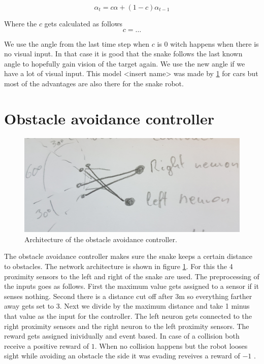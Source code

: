 \begin{equation}
\alpha_t = c \alpha + \left(1 - c\right) \alpha_{t-1}
\end{equation}

Where the $c$ gets calculated as follows
\begin{equation}
c = \dots
\end{equation}

We use the angle from the last time step when $c$ is $0$ witch happens when there is no visual input. In that case it is good that the snake follows the last known angle to hopefully gain vision of the target again. We use the new angle if we have a lot of visual input. This model <insert name> was made by \ref{} for cars but most of the advantages are also there for the snake robot.

\section{Obstacle avoidance controller}

\begin{figure}
	\includegraphics[width=\linewidth]{images/avoid_arch.jpg}
	\caption{Architecture of the obstacle avoidance controller.}
	\label{fig:avoid_arch}
\end{figure}
The obstacle avoidance controller makes sure the snake keeps a certain distance to obstacles. The network architecture is shown in figure \ref{fig:avoid_arch}. For this the 4 proximity sensors to the left and right of the snake are used. The preprocessing of the inputs goes as follows. First the maximum value gets assigned to a sensor if it senses nothing. Second there is a distance cut off after $3$m so everything farther away gets set to $3$. Next we divide by the maximum distance and take 1 minus that value as the input for the controller.
The left neuron gets connected to the right proximity sensors and the right neuron to the left proximity sensors. The reward gets assigned inividually and event based. In case of a collision both receive a positive reward of $1$. When no collision happens but the robot looses sight while avoiding an obstacle the side it was evading reveives a reward of $-1$ .

